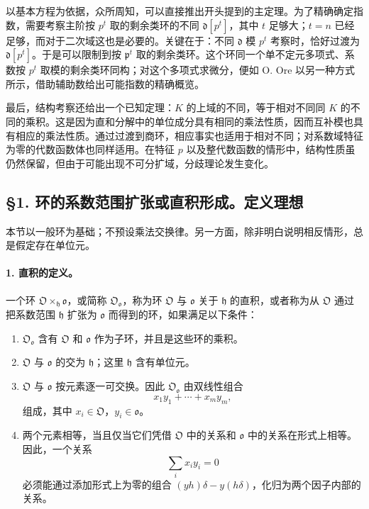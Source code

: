 以基本方程为依据，众所周知，可以直接推出开头提到的主定理。为了精确确定指数，需要考察主阶按 \(p^t\) 取的剩余类环的不同 \(\mathfrak d[p^t]\)，其中 \(t\) 足够大；\(t=n\) 已经足够，而对于二次域这也是必要的。关键在于：不同 \(\mathfrak d\) 模 \(p^t\) 考察时，恰好过渡为 \(\mathfrak d[p^t]\)。于是可以限制到按 \(\mathfrak p^t\) 取的剩余类环。这个环同一个单不定元多项式、系数按 \(p^t\) 取模的剩余类环同构；对这个多项式求微分，便如 O. Ore 以另一种方式所示，借助辅助数给出可能指数的精确概览。

最后，结构考察还给出一个已知定理：\(K\) 的上域的不同，等于相对不同同 \(K\) 的不同的乘积。这是因为直和分解中的单位成分具有相同的乘法性质，因而互补模也具有相应的乘法性质。通过过渡到商环，相应事实也适用于相对不同；对系数域特征为零的代数函数体也同样适用。在特征 \(p\) 以及整代数函数的情形中，结构性质虽仍然保留，但由于可能出现不可分扩域，分歧理论发生变化。

\subsection*{§1. 环的系数范围扩张或直积形成。定义理想}

本节以一般环为基础；不预设乘法交换律。另一方面，除非明白说明相反情形，总是假定存在单位元。

\paragraph{1. 直积的定义。}
一个环 \(\mathfrak O\times_{\mathfrak h}\mathfrak o\)，或简称 \(\mathfrak O_{\mathfrak o}\)，称为环 \(\mathfrak O\) 与 \(\mathfrak o\) 关于 \(\mathfrak h\) 的直积，或者称为从 \(\mathfrak O\) 通过把系数范围 \(\mathfrak h\) 扩张为 \(\mathfrak o\) 而得到的环，如果满足以下条件：

\begin{enumerate}
\item \(\mathfrak O_{\mathfrak o}\) 含有 \(\mathfrak O\) 和 \(\mathfrak o\) 作为子环，并且是这些环的乘积。
\item \(\mathfrak O\) 与 \(\mathfrak o\) 的交为 \(\mathfrak h\)；这里 \(\mathfrak h\) 含有单位元。
\item \(\mathfrak O\) 与 \(\mathfrak o\) 按元素逐一可交换。因此 \(\mathfrak O_{\mathfrak o}\) 由双线性组合
\[
        x_1y_1+\cdots+x_my_m,
\]
组成，其中 \(x_i\in\mathfrak O\)，\(y_i\in\mathfrak o\)。
\item 两个元素相等，当且仅当它们凭借 \(\mathfrak O\) 中的关系和 \(\mathfrak o\) 中的关系在形式上相等。因此，一个关系
\[
        \sum_i x_i y_i=0
\]
必须能通过添加形式上为零的组合 \((yh)\delta-y(h\delta)\)，化归为两个因子内部的关系。
\end{enumerate}

